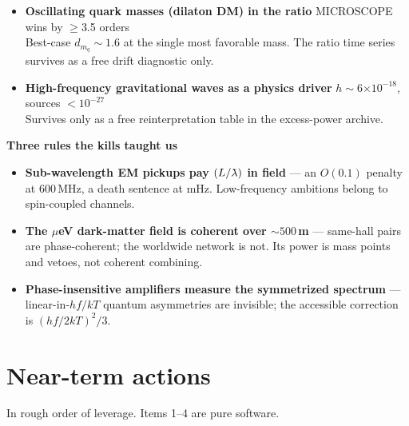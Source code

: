 \documentclass[11pt]{article}
\newcommand{\ueV}{\ensuremath{\mu}eV}
\newcommand{\e}[1]{\ensuremath{\times10^{#1}}}
\newcommand{\lambdabar}{{\mkern0.75mu\mathchar'26\mkern-9.75mu\lambda}}
\begin{document}
\begin{itemize}[leftmargin=1.2em,itemsep=5pt]
{\small In-band cyclotron and terrestrial capture cannot both hold: they miss
each other by $>$an order of magnitude in $\varepsilon$ at every mass.}
\item \textbf{Oscillating quark masses (dilaton DM) in the ratio}
\hfill \textcolor{killink}{\small MICROSCOPE wins by $\geq$3.5 orders}\\
{\small Best-case $d_{m_q}\sim1.6$ at the single most favorable mass. The ratio
time series survives as a free drift diagnostic only.}
\item \textbf{High-frequency gravitational waves as a physics driver}
\hfill \textcolor{killink}{\small $h\sim6\e{-18}$, sources $<10^{-27}$}\\
{\small Survives only as a free reinterpretation table in the excess-power
archive.}
\end{itemize}

\begin{tcolorbox}[colback=numbg,colframe=numbg,arc=2pt,left=8pt,right=8pt]
\textbf{Three rules the kills taught us}
\begin{itemize}[leftmargin=1.2em,itemsep=2pt]
\item \textbf{Sub-wavelength EM pickups pay $(L/\lambdabar)$ in field} --- an
$O(0.1)$ penalty at 600\,MHz, a death sentence at mHz. Low-frequency ambitions
belong to spin-coupled channels.
\item \textbf{The \ueV{} dark-matter field is coherent over ${\sim}500$\,m} ---
same-hall pairs are phase-coherent; the worldwide network is not. Its power is
mass points and vetoes, not coherent combining.
\item \textbf{Phase-insensitive amplifiers measure the symmetrized spectrum}
--- linear-in-$hf/kT$ quantum asymmetries are invisible; the accessible
correction is $(hf/2kT)^2/3$.
\end{itemize}
\end{tcolorbox}

\clearpage
\section{Near-term actions}

\noindent In rough order of leverage. Items 1--4 are pure software.
\end{document}
